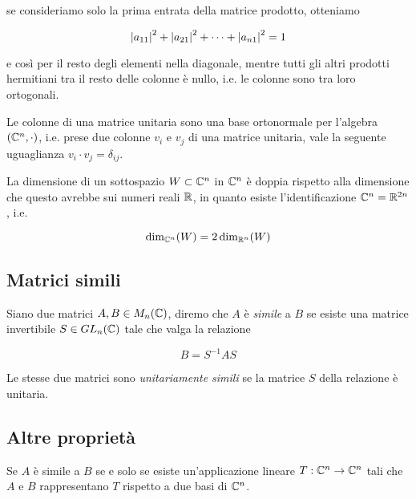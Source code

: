 se consideriamo solo la prima entrata della matrice prodotto, otteniamo

\begin{equation}
	\abs{a_{11}}^{2} + \abs{a_{21}}^{2} + \cdots + \abs{a_{n1}}^{2} = 1
\end{equation}

e così per il resto degli elementi nella diagonale, mentre tutti gli altri prodotti hermitiani tra il resto delle colonne è nullo, i.e. le colonne sono tra loro ortogonali.

\begin{definition}
	Le colonne di una matrice unitaria sono una base ortonormale per l'algebra $ (\mathbb{C}^{n},\cdot) $, i.e. prese due colonne $ v_{i} $ e $ v_{j} $ di una matrice unitaria, vale la seguente uguaglianza $ v_{i} \cdot v_{j} = \delta_{ij} $.
\end{definition}


\begin{definition}
	La dimensione di un sottospazio $ W \subset \mathbb{C}^{n} $ in $ \mathbb{C}^{n} $ è doppia rispetto alla dimensione che questo avrebbe sui numeri reali $ \mathbb{R} $, in quanto esiste l'identificazione $ \mathbb{C}^{n} = \mathbb{R}^{2n} $, i.e.

	\begin{equation}
		\dim_{\mathbb{C}^{n}}(W) = 2 \dim_{\mathbb{R}^{n}}(W)
	\end{equation}
\end{definition}

\subsection{Matrici simili}

Siano due matrici $ A,B \in M_{n}(\mathbb{C}) $, diremo che $ A $ è \textit{simile} a $ B $ se esiste una matrice invertibile $ S \in GL_{n}(\mathbb{C}) $ tale che valga la relazione

\begin{equation}
	B = S^{-1} A S
\end{equation}

Le stesse due matrici sono \textit{unitariamente simili} se la matrice $ S $ della relazione è unitaria.

\subsection{Altre proprietà}

\begin{definition}
	Se $ A $ è simile a $ B $ se e solo se esiste un'applicazione lineare $ T : \mathbb{C}^{n} \to \mathbb{C}^{n} $ tali che $ A $ e $ B $ rappresentano $ T $ rispetto a due basi di $ \mathbb{C}^{n} $.
\end{definition}

